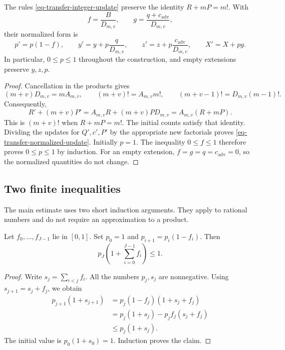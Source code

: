 \begin{lemma}\label{lem-transfer-normalization}
The rules \eqref{eq-transfer-integer-update} preserve the identity
$R+mP=m!$. With
\[
 f=\frac{B}{D_{m,v}},\qquad
 g=\frac{q+c_{\mathrm{adv}}}{D_{m,v}},
\]
their normalized form is
\begin{equation}
 p'=p(1-f),\qquad
 y'=y+p\frac{q}{D_{m,v}},\qquad
 z'=z+p\frac{c_{\mathrm{adv}}}{D_{m,v}},\qquad
 X'=X+pg.
 \label{eq-transfer-normalized-update}
\end{equation}
In particular, $0\le p\le1$ throughout the construction, and empty
extensions preserve $y,z,p$.
\end{lemma}

\begin{proof}
Cancellation in the products gives
\[
 (m+v)D_{m,v}=mA_{m,v},\qquad
 (m+v)!=A_{m,v}m!,\qquad
 (m+v-1)!=D_{m,v}(m-1)!.
\]
Consequently,
\[
 R'+(m+v)P'
 =A_{m,v}R+(m+v)PD_{m,v}
 =A_{m,v}(R+mP).
\]
This is $(m+v)!$ when $R+mP=m!$. The initial counts satisfy that identity.
Dividing the updates for $Q',c',P'$ by the appropriate new factorials
proves \eqref{eq-transfer-normalized-update}. Initially $p=1$.
The inequality $0\le f\le1$ therefore proves $0\le p\le1$ by induction.
For an empty extension, $f=g=q=c_{\mathrm{adv}}=0$, so the normalized
quantities do not change.
\end{proof}

\subsection{Two finite inequalities}

The main estimate uses two short induction arguments. They apply to
rational numbers and do not require an approximation to a product.

\begin{lemma}\label{lem-transfer-pending}
Let $f_0,\ldots,f_{J-1}$ lie in $[0,1]$. Set $p_0=1$ and
$p_{i+1}=p_i(1-f_i)$. Then
\[
 p_J\left(1+\sum_{i=0}^{J-1}f_i\right)\le1.
\]
\end{lemma}

\begin{proof}
Write $s_j=\sum_{i<j}f_i$. All the numbers $p_j,s_j$ are nonnegative.
Using $s_{j+1}=s_j+f_j$, we obtain
\begin{align*}
 p_{j+1}(1+s_{j+1})
 &=p_j(1-f_j)(1+s_j+f_j)\\
 &=p_j(1+s_j)-p_jf_j(s_j+f_j)\\
 &\le p_j(1+s_j).
\end{align*}
The initial value is $p_0(1+s_0)=1$. Induction proves the claim.
\end{proof}

